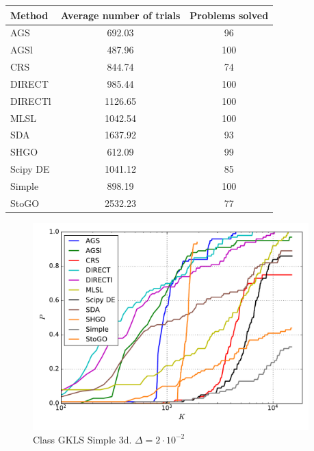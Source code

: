\documentclass[a4paper]{article}
\begin{document}
\begin{tabular}{lcc}
\hline
 Method   &  Average number of trials  &  Problems solved  \\
\hline
 AGS      &           692.03           &        96         \\
 AGSl     &           487.96           &        100        \\
 CRS      &           844.74           &        74         \\
 DIRECT   &           985.44           &        100        \\
 DIRECTl  &          1126.65           &        100        \\
 MLSL     &          1042.54           &        100        \\
 SDA      &          1637.92           &        93         \\
 SHGO     &           612.09           &        99         \\
 Scipy DE &          1041.12           &        85         \\
 Simple   &           898.19           &        100        \\
 StoGO    &          2532.23           &        77         \\
\hline
\end{tabular}
\begin{figure}[H]
  \center
  \includegraphics[width=0.95\textwidth]{../experiments/gklss3d/cmc.pdf}
  \caption{Class GKLS Simple 3d. $\Delta=2\cdot10^{-2}$}
\end{figure}
\end{document}
